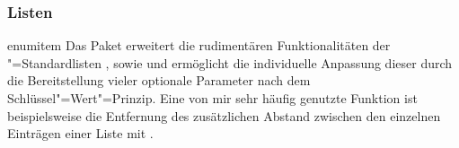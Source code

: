 \subsubsection{Listen}
\begin{packages}
\item[enumitem]
  Das Paket  erweitert die rudimentären Funktionalitäten der 
  "=Standardlisten , 
  sowie  und ermöglicht die individuelle Anpassung 
  dieser durch die Bereitstellung vieler optionale Parameter nach dem
  Schlüssel"=Wert"=Prinzip. Eine von mir sehr häufig genutzte Funktion ist 
  beispielsweise die Entfernung des zusätzlichen Abstand zwischen den einzelnen 
  Einträgen einer Liste mit .
\end{packages}

